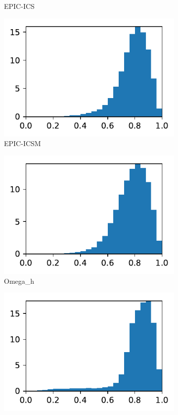 \documentclass[3p,times,procedia,number]{elsarticle}
\begin{document}
\begin{figure}
\begin{subfigure}{.16\textwidth}
\caption{EPIC-ICS}
\end{subfigure}
\begin{subfigure}{.16\textwidth}
\centering
\includegraphics[width=\textwidth]{epic-icsm-cube-cylinder-linear-quality.pdf}
\caption{EPIC-ICSM}
\end{subfigure}
\begin{subfigure}{.16\textwidth}
\centering
\includegraphics[width=\textwidth]{omega_h-cube-cylinder-linear-quality.pdf}
\caption{Omega\_h}
\end{subfigure}
\begin{subfigure}{.16\textwidth}
\centering
\includegraphics[width=\textwidth]{pragmatic-cube-cylinder-linear-quality.pdf}

\end{subfigure}
\end{figure}
\end{document}
